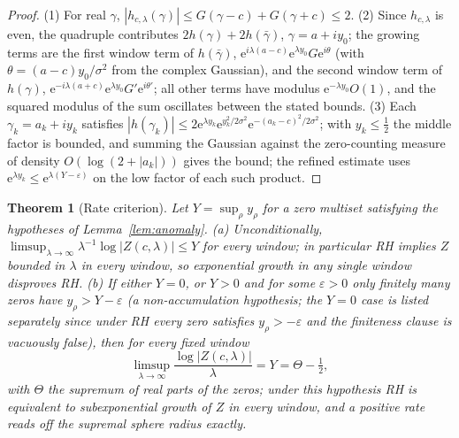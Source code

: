 \documentclass[11pt]{amsart}
\theoremstyle{plain}
\newtheorem{mainthm}{Theorem}
\theoremstyle{definition}
\theoremstyle{remark}
\newcommand{\eE}{\mathrm{e}}
\begin{document}
\begin{proof}
(1) For real $\gamma$, $|h_{c,\lambda}(\gamma)|\le G(\gamma-c)+G(\gamma+c)\le2$. (2) Since
$h_{c,\lambda}$ is even, the quadruple contributes $2h(\gamma)+2h(\bar\gamma)$,
$\gamma=a+iy_0$; the growing terms are the first window term of $h(\bar\gamma)$,
$\eE^{i\lambda(a-c)}\eE^{\lambda y_0}G\eE^{i\theta}$ (with $\theta=(a-c)y_0/\sigma^2$ from the
complex Gaussian), and the second window term of $h(\gamma)$,
$\eE^{-i\lambda(a+c)}\eE^{\lambda y_0}G'\eE^{i\theta'}$; all other terms have modulus
$\eE^{-\lambda y_0}O(1)$, and the squared modulus of the sum oscillates between the stated
bounds. (3) Each $\gamma_k=a_k+iy_k$ satisfies
$|h(\gamma_k)|\le2\eE^{\lambda y_k}\eE^{y_k^2/2\sigma^2}\eE^{-(a_k-c)^2/2\sigma^2}$; with
$y_k\le\tfrac12$ the middle factor is bounded, and summing the Gaussian against the zero-counting
measure of density $O(\log(2+|a_k|))$ gives the bound; the refined estimate uses
$\eE^{\lambda y_k}\le\eE^{\lambda(Y-\varepsilon)}$ on the low factor of each such product.
\end{proof}

\begin{mainthm}[Rate criterion]\label{thm:F}
Let $Y=\sup_\rho y_\rho$ for a zero multiset satisfying the hypotheses of
Lemma~\ref{lem:anomaly}.
\textup{(a)} Unconditionally,
$\limsup_{\lambda\to\infty}\lambda^{-1}\log|Z(c,\lambda)|\le Y$ for every window; in particular RH
implies $Z$ bounded in $\lambda$ in every window, so exponential growth in any single window
disproves RH. \textup{(b)} If either $Y=0$, or $Y>0$ and for some $\varepsilon>0$ only finitely
many zeros have $y_\rho>Y-\varepsilon$ (a non-accumulation hypothesis; the $Y=0$ case is listed
separately since under RH every zero satisfies $y_\rho>-\varepsilon$ and the finiteness clause
is vacuously false), then for every fixed window
\[
\limsup_{\lambda\to\infty}\frac{\log|Z(c,\lambda)|}{\lambda}=Y=\Theta-\tfrac12,
\]
with $\Theta$ the supremum of real parts of the zeros; under this hypothesis RH is equivalent to
subexponential growth of $Z$ in every window, and a positive rate reads off the supremal sphere
radius exactly.
\end{mainthm}
\end{document}
